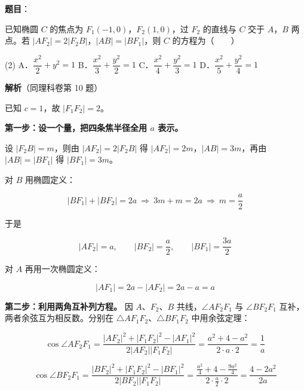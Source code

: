 \begin{answer}

\textbf{题目}：

已知椭圆 $C$ 的焦点为 $F_1(-1,0)$，$F_2(1,0)$，过 $F_2$ 的直线与 $C$ 交于 $A$，$B$ 两点。若 $\left|AF_2\right|=2\left|F_2B\right|$，$|AB|=\left|BF_1\right|$，则 $C$ 的方程为\mbox{（　　）}

\begin{gkopts}(2)
\task A．$\dfrac{x^{2}}2+y^{2}=1$
\task B．$\dfrac{x^{2}}3+\dfrac{y^{2}}2=1$
\task C．$\dfrac{x^{2}}4+\dfrac{y^{2}}3=1$
\task D．$\dfrac{x^{2}}5+\dfrac{y^{2}}4=1$
\end{gkopts}

\Needspace{0.6\textheight}

\textbf{解析}（同理科卷第 10 题）

已知 $c=1$，故 $\left|F_1F_2\right|=2$。

\textbf{第一步：设一个量，把四条焦半径全用 $a$ 表示。}

设 $\left|F_2B\right|=m$，则由 $\left|AF_2\right|=2\left|F_2B\right|$ 得 $\left|AF_2\right|=2m$，$|AB|=3m$，再由 $|AB|=\left|BF_1\right|$ 得 $\left|BF_1\right|=3m$。

对 $B$ 用椭圆定义：

\nopagebreak[4]
\[\left|BF_1\right|+\left|BF_2\right|=2a\ \Longrightarrow\ 3m+m=2a\ \Longrightarrow\ m=\frac a2\]

于是

\nopagebreak[4]
\[\left|AF_2\right|=a,\qquad \left|BF_2\right|=\frac a2,\qquad \left|BF_1\right|=\frac{3a}2\]

对 $A$ 再用一次椭圆定义：

\nopagebreak[4]
\[\left|AF_1\right|=2a-\left|AF_2\right|=2a-a=a\]

\textbf{第二步：利用两角互补列方程。} 因 $A$、$F_2$、$B$ 共线，$\angle AF_2F_1$ 与 $\angle BF_2F_1$ 互补，两者余弦互为相反数。分别在 $\triangle AF_1F_2$、$\triangle BF_1F_2$ 中用余弦定理：

\nopagebreak[4]
\[\cos\angle AF_2F_1=\frac{\left|AF_2\right|^{2}+\left|F_1F_2\right|^{2}-\left|AF_1\right|^{2}}{2\left|AF_2\right|\left|F_1F_2\right|}=\frac{a^{2}+4-a^{2}}{2\cdot a\cdot2}=\frac1a\]

\nopagebreak[4]
\[\cos\angle BF_2F_1=\frac{\left|BF_2\right|^{2}+\left|F_1F_2\right|^{2}-\left|BF_1\right|^{2}}{2\left|BF_2\right|\left|F_1F_2\right|}=\frac{\frac{a^{2}}4+4-\frac{9a^{2}}4}{2\cdot\frac a2\cdot2}=\frac{4-2a^{2}}{2a}\]


\end{answer}
